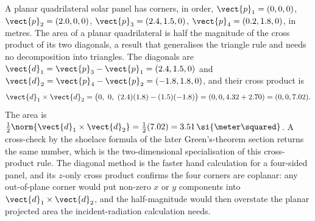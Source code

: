 \begin{example}
A planar quadrilateral solar panel has corners, in order,
$\vect{p}_{1} = (0, 0, 0)$, $\vect{p}_{2} = (2.0, 0, 0)$,
$\vect{p}_{3} = (2.4, 1.5, 0)$, $\vect{p}_{4} = (0.2, 1.8, 0)$, in
metres. The area of a planar quadrilateral is half the magnitude of
the cross product of its two diagonals, a result that generalises the
triangle rule and needs no decomposition into triangles. The diagonals
are $\vect{d}_{1} = \vect{p}_{3} - \vect{p}_{1} = (2.4, 1.5, 0)$ and
$\vect{d}_{2} = \vect{p}_{4} - \vect{p}_{2} = (-1.8, 1.8, 0)$, and
their cross product is
\[
\vect{d}_{1}\times\vect{d}_{2} = \big(0,\ 0,\ (2.4)(1.8) -
(1.5)(-1.8)\big) = (0, 0, 4.32 + 2.70) = (0, 0, 7.02).
\]
The area is $\tfrac{1}{2}\norm{\vect{d}_{1}\times\vect{d}_{2}} =
\tfrac{1}{2}(7.02) = 3.51\,\si{\meter\squared}$. A cross-check by the
shoelace formula of the later Green's-theorem section returns the same
number, which is the two-dimensional specialisation of this
cross-product rule. The diagonal method is the faster hand calculation
for a four-sided panel, and its $z$-only cross product confirms the
four corners are coplanar: any out-of-plane corner would put non-zero
$x$ or $y$ components into $\vect{d}_{1}\times\vect{d}_{2}$, and the
half-magnitude would then overstate the planar projected area the
incident-radiation calculation needs.
\end{example}

